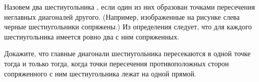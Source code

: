 \documentclass[a4paper,11pt]{article}
\begin{document}


{
 Назовем два шестиугольника
, если один из
них образован
точками пересечения неглавных диагоналей
другого. (Например, изображенные на рисунке
слева черные шестиугольники сопряжены.)
Из определения следует, что для каждого шестиугольника имеется
ровно два с ним сопряженных.
}


 Докажите, что  главные диагонали шестиугольника
пересекаются в одной точке тогда и только тогда, когда
точки пересечения противоположных сторон сопряженного
с ним шестиугольника лежат на одной прямой.
\end{document}
